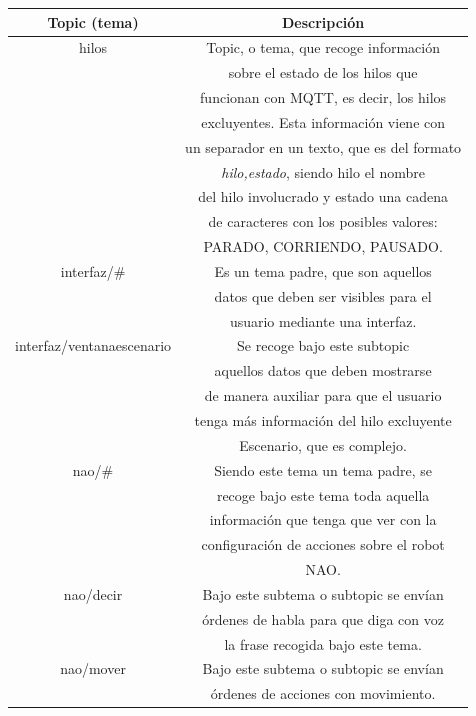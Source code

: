 \documentclass[12pt,spanish,listoffigures,listoftables]{tfgetsinf}
\begin{document}
\begin{table}[!h]
\begin{center}
\begin{tabular}{|c|c|}
	\hline 
	\textbf{Topic (tema)} & \textbf{Descripción} \\ 
	\hline 
	hilos & Topic, o tema, que recoge información \\
	& sobre el estado de los hilos que \\
	& funcionan con MQTT, es decir, los hilos \\ 
	& excluyentes. Esta información viene con \\ 
	& un separador en un texto, que es del formato \\ 
	& \textit{hilo,estado}, siendo hilo el nombre \\
	& del hilo involucrado y estado una cadena \\ 
	& de caracteres con los posibles valores: \\ 
	& PARADO, CORRIENDO, PAUSADO. \\ 
	\hline 
	interfaz/\# & Es un tema padre, que son aquellos \\
	& datos que deben ser visibles para el \\ 
	& usuario mediante una interfaz. \\
	\hline 
	interfaz/ventanaescenario & Se recoge bajo este subtopic \\ 
	& aquellos datos que deben mostrarse \\
	& de manera auxiliar para que el usuario \\
	& tenga más información del hilo excluyente \\
	& Escenario, que es complejo. \\ 
	\hline 
	nao/\# & Siendo este tema un tema padre, se \\
	& recoge bajo este tema toda aquella \\
	& información que tenga que ver con la \\
	& configuración de acciones sobre el robot \\
	& NAO. \\ 
	\hline 
	nao/decir & Bajo este subtema o subtopic se envían \\
	& órdenes de habla para que diga con voz \\
	& la frase recogida bajo este tema. \\ 
	\hline 
	nao/mover & Bajo este subtema o subtopic se envían \\
	& órdenes de acciones con movimiento. \\

\end{tabular}
\end{center}
\end{table}
\end{document}
